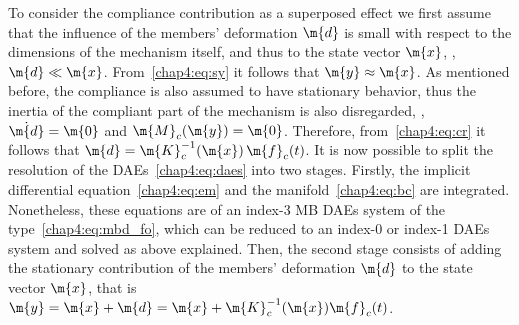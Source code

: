 To consider the compliance contribution as a superposed effect we first assume that the influence of the members' deformation $\m{d}$ is small with respect to the dimensions of the mechanism itself, and thus to the state vector $\m{x}$, \ie{}, $\m{d} \ll \m{x}$. From~\eqref{chap4:eq:sy} it follows that $\m{y} \approx \m{x}$. As mentioned before, the compliance is also assumed to have stationary behavior, thus the inertia of the compliant part of the mechanism is also disregarded, \ie{}, $\dot{\m{d}} = \m{0}$ and $\m{M}_c(\m{y}) = \m{0}$. Therefore, from~\eqref{chap4:eq:cr} it follows that $\m{d} = \m{K}_c^{-1}(\m{x}) \, \m{f}_c(t)$. It is now possible to split the resolution of the \acp{DAE}~\eqref{chap4:eq:daes} into two stages. Firstly, the implicit differential equation~\eqref{chap4:eq:em} and the manifold~\eqref{chap4:eq:bc} are integrated. Nonetheless, these equations are of an index-3 \ac{MB} \acp{DAE} system of the type~\eqref{chap4:eq:mbd_fo}, which can be reduced to an index-0 or index-1 \acp{DAE} system and solved as above explained. Then, the second stage consists of adding the stationary contribution of the members' deformation $\m{d}$ to the state vector $\m{x}$, that is $\m{y} = \m{x} + \m{d} = \m{x} + \m{K}_c^{-1}(\m{x}) \m{f}_c(t)$.

